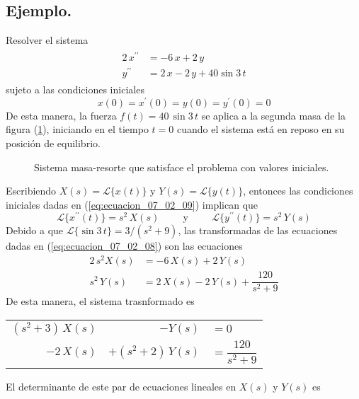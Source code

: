 \subsection*{Ejemplo.}
Resolver el sistema
\begin{align}
\begin{aligned}
2 \, x^{\prime \prime} &=  - 6 \, x + 2 \, y \\
y^{\prime \prime} &= 2 \, x - 2 \, y + 40 \sin 3 \, t
\end{aligned}
\label{eq:ecuacion_07_02_08}
\end{align}
sujeto a las condiciones iniciales
\begin{equation}
x(0) = x^{\prime} (0) = y(0) = y^{\prime} (0) = 0
\label{eq:ecuacion_07_02_09}
\end{equation}
De esta manera, la fuerza $f(t) = 40 \, \sin 3 \, t$ se aplica a la segunda masa de la figura (\ref{fig:figura_005}), iniciando en el tiempo $t=0$ cuando el sistema está en reposo en su posición de equilibrio.
\begin{figure}[H]
    \centering
    
    \caption{Sistema masa-resorte que satisface el problema con valores iniciales.}
    \label{fig:figura_005}
\end{figure}
Escribiendo $X(s) = \mathscr{L} \{ x(t) \} $ y $Y(s) = \mathscr{L} \{ y(t) \} $, entonces las condiciones iniciales dadas en (\ref{eq:ecuacion_07_02_09}) implican que
\[ \mathscr{L} \{ x^{\prime \prime} (t) \} = s^{2} \, X(s) \hspace{1cm} \mbox{y} \hspace{1cm} \mathscr{L} \{ y^{\prime \prime}(t) \} = s^{2} \, Y(s) \]
Debido a que $\mathscr{L} \{ \sin 3 \, t \} = 3 / (s^{2} + 9)$, las transformadas de las ecuaciones dadas en (\ref{eq:ecuacion_07_02_08}) son las ecuaciones
\begin{align*}
2 \, s^{2} X(s) &= - 6 \, X(s) + 2 \, Y(s) \\
s^{2} \, Y(s) &= 2 \, X(s) - 2 \, Y(s) + \dfrac{120}{s^{2} + 9}
\end{align*}
De esta manera, el sistema trasnformado es
\par
\begin{center}
\begin{tabular}{r r l}
$(s^{2} + 3) \, X(s)$ & $-Y(s)$ & $=0$ \\
$-2 \, X(s)$ & $+(s^{2} + 2) \, Y(s)$ & $=\dfrac{120}{s^{2}+9}$ 
\end{tabular}
\end{center}
El determinante de este par de ecuaciones lineales en $X(s)$ y $Y(s)$ es
